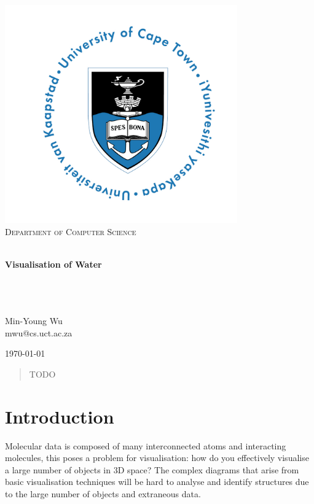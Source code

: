\documentclass[a4paper]{article}
\begin{document}
\begin{titlepage}
\begin{center}
  \includegraphics[width=100mm]{uct}\\
  \textsc{\large
  Department of Computer Science \\
  \ \\}

  {\huge \bfseries Visualisation of Water}

  \ \\
  \ \\
  \ \\
  \large Min-Young Wu \\
  \small mwu@cs.uct.ac.za

  \vfill
  \large \today

  \begin{abstract}
  TODO
  \end{abstract}

\end{center}
\end{titlepage}

\tableofcontents
\listoffigures

\newpage



\section{Introduction}
Molecular data is composed of many interconnected atoms and interacting
molecules, this poses a problem for visualisation: how do you effectively
visualise a large number of objects in 3D space? The complex diagrams that arise
from basic visualisation techniques will be hard to analyse and identify
structures due to the large number of objects and extraneous data.
\end{document}

